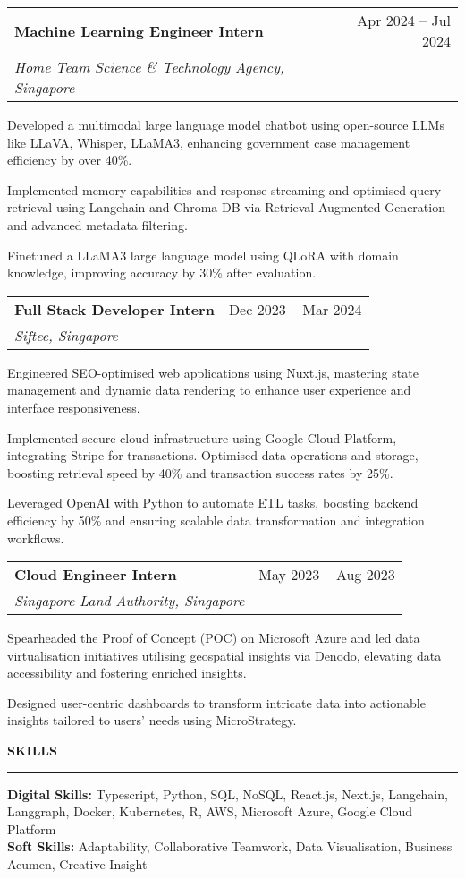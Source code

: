 \documentclass[11pt,letterpaper]{article}
\makeatletter
\newcommand{\resheading}[1]{%
  \vspace{2pt}
  {\normalsize \textbf{\MakeUppercase{#1}}}\\
  \vspace{-8pt}
  \hrule
}
\newcommand{\resitem}[1]{\item \small #1 \vspace{-2pt}}
\newcommand{\ressubheading}[4]{
    \vspace{2pt}
    \begin{tabular*}{\textwidth}{l@{\extracolsep{\fill}}r}
        \small \textbf{#1} & \small #2 \\
        \small \textit{#3} & \small \textit{#4} \\
    \end{tabular*}\vspace{-3pt}}
\makeatother
\begin{document}
\begin{leftitemize}
\item[]
\ressubheading{Machine Learning Engineer Intern}{Apr 2024 -- Jul 2024}{Home Team Science \& Technology Agency, Singapore}{}
\begin{subitemize}
    \resitem{Developed a multimodal large language model chatbot using open-source LLMs like LLaVA, Whisper, LLaMA3, enhancing government case management efficiency by over 40\%.}
    \resitem{Implemented memory capabilities and response streaming and optimised query retrieval using Langchain and Chroma DB via Retrieval Augmented Generation and advanced metadata filtering.}
    \resitem{Finetuned a LLaMA3 large language model using QLoRA with domain knowledge, improving accuracy by 30\% after evaluation.}
\end{subitemize}

\item[]
\ressubheading{Full Stack Developer Intern}{Dec 2023 -- Mar 2024}{Siftee, Singapore}{}
\begin{subitemize}
    \resitem{Engineered SEO-optimised web applications using Nuxt.js, mastering state management and dynamic data rendering to enhance user experience and interface responsiveness.}
    \resitem{Implemented secure cloud infrastructure using Google Cloud Platform, integrating Stripe for transactions. Optimised data operations and storage, boosting retrieval speed by 40\% and transaction success rates by 25\%.}
    \resitem{Leveraged OpenAI with Python to automate ETL tasks, boosting backend efficiency by 50\% and ensuring scalable data transformation and integration workflows.}
\end{subitemize}

\item[]
\ressubheading{Cloud Engineer Intern}{May 2023 -- Aug 2023}{Singapore Land Authority, Singapore}{}
\begin{subitemize}
    \resitem{Spearheaded the Proof of Concept (POC) on Microsoft Azure and led data virtualisation initiatives utilising geospatial insights via Denodo, elevating data accessibility and fostering enriched insights.}
    \resitem{Designed user-centric dashboards to transform intricate data into actionable insights tailored to users' needs using MicroStrategy.}
\end{subitemize}
\end{leftitemize}

\resheading{Skills}
\begin{leftitemize}
\item[]
\small \textbf{Digital Skills:} Typescript, Python, SQL, NoSQL, React.js, Next.js, Langchain, Langgraph, Docker, Kubernetes, R, AWS, Microsoft Azure, Google Cloud Platform\\[4pt]
\small \textbf{Soft Skills:} Adaptability, Collaborative Teamwork, Data Visualisation, Business Acumen, Creative Insight
\end{leftitemize}
\end{document}

